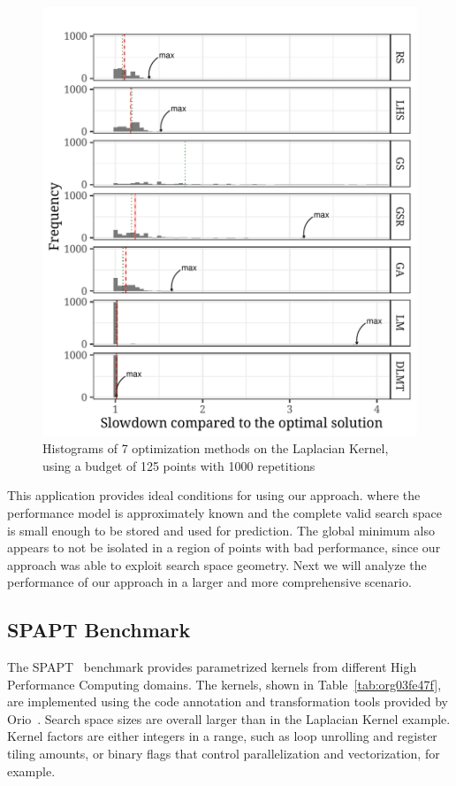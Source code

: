 \documentclass[conference]{IEEEtran}
\begin{document}
\begin{center}
\begin{figure}[ht]
\centering
\includegraphics[width=.9\columnwidth]{./img/comparison_histogram.pdf}
\caption{\label{fig:org6c852f2}
Histograms of 7 optimization methods on the Laplacian Kernel, using a budget of 125 points with 1000 repetitions}
\end{figure}
\end{center}

This application provides ideal conditions for using our approach. where the
performance model is approximately known and the complete valid search space is
small enough to be stored and used for prediction. The global minimum also
appears to not be isolated in a region of points with bad performance, since our
approach was able to exploit search space geometry. Next we will analyze the
performance of our approach in a larger and more comprehensive scenario.
\subsection{SPAPT Benchmark}
\label{sec:orga9d1180}
The SPAPT~\cite{balaprakash2012spapt} benchmark provides parametrized
kernels from different High Performance Computing domains. The kernels, shown in
Table~\ref{tab:org03fe47f}, are implemented using the code annotation and
transformation tools provided by Orio~\cite{hartono2009annotation}. Search
space sizes are overall larger than in the Laplacian Kernel example. Kernel factors
are either integers in a range, such as loop unrolling and register tiling amounts,
or binary flags that control parallelization and vectorization, for example.
\end{document}
